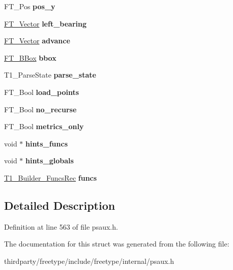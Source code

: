 \begin{DoxyCompactItemize}
F\+T\+\_\+\+Pos {\bfseries pos\+\_\+y}
\item 
\mbox{\label{struct_t1___builder_rec___a86247b8fd87873ef93aecf0e27e4b6dc}} 
\hyperlink{struct_f_t___vector__}{F\+T\+\_\+\+Vector} {\bfseries left\+\_\+bearing}
\item 
\mbox{\label{struct_t1___builder_rec___a48575715ea96f16bdc7077996013ef9e}} 
\hyperlink{struct_f_t___vector__}{F\+T\+\_\+\+Vector} {\bfseries advance}
\item 
\mbox{\label{struct_t1___builder_rec___a534c6d954f8cf791a94489350314a8f7}} 
\hyperlink{struct_f_t___b_box__}{F\+T\+\_\+\+B\+Box} {\bfseries bbox}
\item 
\mbox{\label{struct_t1___builder_rec___afaa675cc3601ed05ed86bc474153094b}} 
T1\+\_\+\+Parse\+State {\bfseries parse\+\_\+state}
\item 
\mbox{\label{struct_t1___builder_rec___acaf59a770471bf90b5b7d9f72e97e64e}} 
F\+T\+\_\+\+Bool {\bfseries load\+\_\+points}
\item 
\mbox{\label{struct_t1___builder_rec___a0369f22bec404666e1c7dc6bb648ac28}} 
F\+T\+\_\+\+Bool {\bfseries no\+\_\+recurse}
\item 
\mbox{\label{struct_t1___builder_rec___ab4c509b363e5a5f4da25460413e9364f}} 
F\+T\+\_\+\+Bool {\bfseries metrics\+\_\+only}
\item 
\mbox{\label{struct_t1___builder_rec___aeed4b5ebe5256cc07e31159b4a4a95ff}} 
void $\ast$ {\bfseries hints\+\_\+funcs}
\item 
\mbox{\label{struct_t1___builder_rec___ae94605dc79c1d54c1b59423046b38671}} 
void $\ast$ {\bfseries hints\+\_\+globals}
\item 
\mbox{\label{struct_t1___builder_rec___acecf3c6c134bccd36a1d30e10147ca54}} 
\hyperlink{struct_t1___builder___funcs_rec__}{T1\+\_\+\+Builder\+\_\+\+Funcs\+Rec} {\bfseries funcs}
\end{DoxyCompactItemize}


\subsection{Detailed Description}


Definition at line 563 of file psaux.\+h.



The documentation for this struct was generated from the following file\+:\begin{DoxyCompactItemize}
\item 
thirdparty/freetype/include/freetype/internal/psaux.\+h\end{DoxyCompactItemize}

